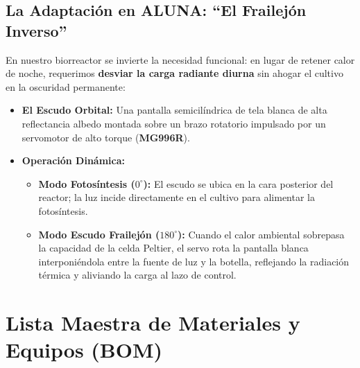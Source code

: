 \documentclass[11pt,letterpaper]{article}
\begin{document}
\subsection{La Adaptación en ALUNA: ``El Frailejón Inverso''}
En nuestro biorreactor se invierte la necesidad funcional: en lugar de retener calor de noche, requerimos \textbf{desviar la carga radiante diurna} sin ahogar el cultivo en la oscuridad permanente:
\begin{itemize}
    \item \textbf{El Escudo Orbital:} Una pantalla semicilíndrica de tela blanca de alta reflectancia albedo montada sobre un brazo rotatorio impulsado por un servomotor de alto torque (\textbf{MG996R}).
    \item \textbf{Operación Dinámica:}
    \begin{itemize}
        \item \textbf{Modo Fotosíntesis ($0^\circ$):} El escudo se ubica en la cara posterior del reactor; la luz incide directamente en el cultivo para alimentar la fotosíntesis.
        \item \textbf{Modo Escudo Frailejón ($180^\circ$):} Cuando el calor ambiental sobrepasa la capacidad de la celda Peltier, el servo rota la pantalla blanca interponiéndola entre la fuente de luz y la botella, reflejando la radiación térmica y aliviando la carga al lazo de control.
    \end{itemize}
\end{itemize}

\section{Lista Maestra de Materiales y Equipos (BOM)}
\end{document}
